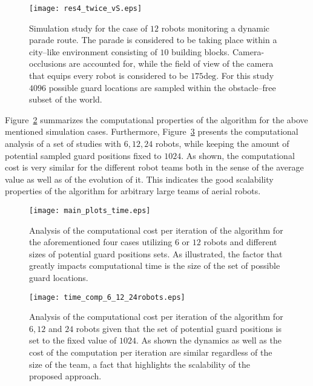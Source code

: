 \documentclass[letterpaper, 10 pt, conference]{ieeeconf}  %
\begin{document}
%
\begin{figure}[htbp]
\centering
  \texttt{[image: res4\_twice\_vS.eps]}
\caption{Simulation study for the case of $12$ robots monitoring a dynamic parade route. The parade is considered to be taking place within a city--like environment consisting of $10$ building blocks. Camera-occlusions are accounted for, while the field of view of the camera that equips every robot is considered to be $175\textrm{deg}$. For this study $4096$ possible guard locations are sampled within the obstacle--free subset of the world. }
\label{fig:res2b}
\end{figure}
%

Figure~\ref{fig:res_time} summarizes the computational properties of the algorithm for the above mentioned simulation cases. Furthermore, Figure~\ref{fig:timemultirob} presents the computational analysis of a set of studies with $6,12,24$ robots, while keeping the amount of potential sampled guard positions fixed to $1024$. As shown, the computational cost is very similar for the different robot teams both in the sense of the average value as well as of the evolution of it. This indicates the good scalability properties of the algorithm for arbitrary large teams of aerial robots. 

%
\begin{figure}[htbp]
\centering
  \texttt{[image: main\_plots\_time.eps]}
\caption{Analysis of the computational cost per iteration of the algorithm for the aforementioned four cases utilizing $6$ or $12$ robots and different sizes of potential guard positions sets. As illustrated, the factor that greatly impacts computational time is the size of the set of possible guard locations. }
\label{fig:res_time}
\end{figure}
%

%
\begin{figure}[htbp]
\centering
  \texttt{[image: time\_comp\_6\_12\_24robots.eps]}
\caption{Analysis of the computational cost per iteration of the algorithm for $6,12$ and $24$ robots given that the set of potential guard positions is set to the fixed value of $1024$. As shown the dynamics as well as the cost of the computation per iteration are similar regardless of the size of the team, a fact that highlights the scalability of the proposed approach.  }
\label{fig:timemultirob}
\end{figure}
%
\end{document}
